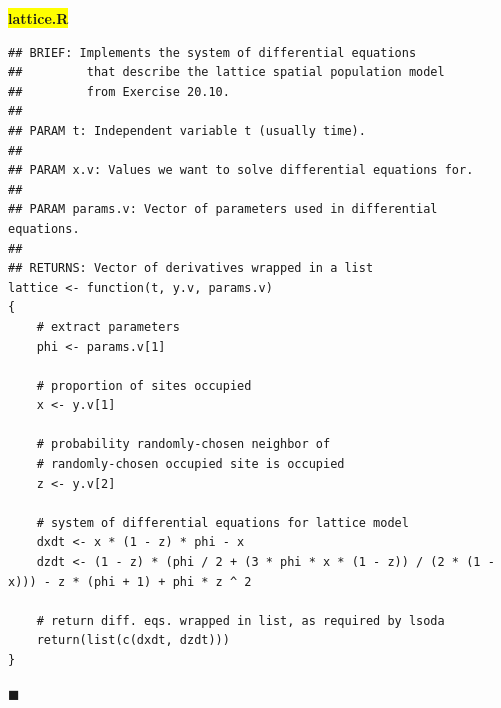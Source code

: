 \documentclass[11pt]{article}
\newcommand{\mybox}{%
    \collectbox{%
        \setlength{\fboxsep}{2pt}%
        \fbox{\BOXCONTENT}%
    }%
}
\begin{document}
\vspace{10mm}

\noindent\mybox{\colorbox{yellow}{\textbf{lattice.R}}}\hspace{3mm}\hrulefill
\begin{lstlisting}
## BRIEF: Implements the system of differential equations  
##         that describe the lattice spatial population model
##         from Exercise 20.10.
##	
## PARAM t: Independent variable t (usually time).
##
## PARAM x.v: Values we want to solve differential equations for.
##
## PARAM params.v: Vector of parameters used in differential equations.
##
## RETURNS: Vector of derivatives wrapped in a list
lattice <- function(t, y.v, params.v)
{
	# extract parameters
	phi <- params.v[1]
	
	# proportion of sites occupied 
	x <- y.v[1]
	
	# probability randomly-chosen neighbor of
	# randomly-chosen occupied site is occupied 
	z <- y.v[2]
	
	# system of differential equations for lattice model	
	dxdt <- x * (1 - z) * phi - x
	dzdt <- (1 - z) * (phi / 2 + (3 * phi * x * (1 - z)) / (2 * (1 - x))) - z * (phi + 1) + phi * z ^ 2
	
	# return diff. eqs. wrapped in list, as required by lsoda
	return(list(c(dxdt, dzdt)))
}
\end{lstlisting}

\hfill$\blacksquare$

\vfill
\begin{center}
\end{center}
\begin{center}
\vspace{-0.6cm}
\hrulefill \\
\vspace{-0.7cm}
\hrulefill
\end{center}
\end{document}
